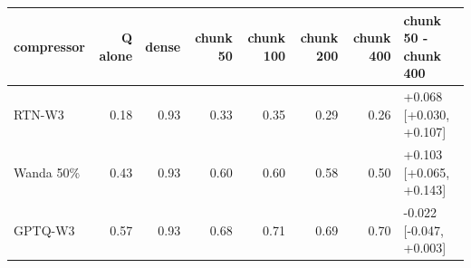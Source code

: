 \begin{tabular}{lrrrrrrl}
\toprule
compressor & Q alone & dense & chunk 50 & chunk 100 & chunk 200 & chunk 400 & chunk 50 - chunk 400 \\
\midrule
RTN-W3 & 0.18 & 0.93 & 0.33 & 0.35 & 0.29 & 0.26 & +0.068 [+0.030, +0.107] \\
Wanda 50\% & 0.43 & 0.93 & 0.60 & 0.60 & 0.58 & 0.50 & +0.103 [+0.065, +0.143] \\
GPTQ-W3 & 0.57 & 0.93 & 0.68 & 0.71 & 0.69 & 0.70 & -0.022 [-0.047, +0.003] \\
\bottomrule
\end{tabular}
